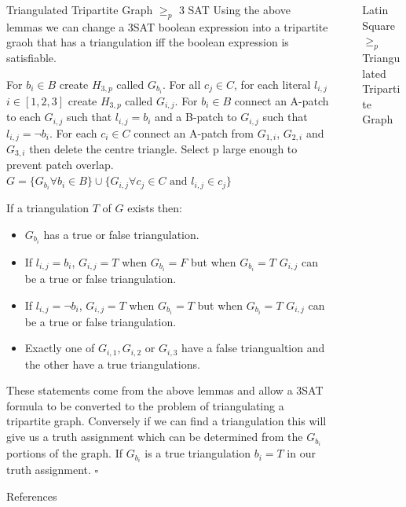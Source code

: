 \documentclass[final]{beamer}
\newlength{\sepwidth}
\newlength{\colwidth}
\newcounter{col}
\newcommand{\separatorcolumn}{\begin{column}{\sepwidth}\end{column}}
\begin{document}
\begin{frame}[t]
\begin{columns}[t]
\begin{column}{\colwidth}
\begin{block}{Triangulated Tripartite Graph $\geq_p$ 3 SAT}
Using the above lemmas we can change a 3SAT boolean expression into a tripartite graoh that has a triangulation iff the boolean expression is satisfiable.

For $b_i\in B$ create $H_{3,p}$ called $G_{b_i}$. For all $c_j\in C$, for each literal $l_{i,j}$ $i\in [1,2,3]$  create $H_{3,p}$ called $G_{i,j}$. For $b_i \in B$ connect an A-patch to each $G_{i,j}$ such that $l_{i,j}=b_i$ and a B-patch to $G_{i,j}$ such that $l_{i,j}=\neg b_i$. For each $c_i\in C$ connect an A-patch from $G_{1,i}$, $G_{2,i}$ and $G_{3,i}$ then delete the centre triangle. Select p large enough to prevent patch overlap. $G = \{G_{b_i} \forall b_i \in B\}\cup\{G_{i,j} \forall c_j\in C\text{ and }l_{i,j}\in c_j \}$

If a triangulation $T$ of $G$ exists then: 
\begin{itemize}
\item $G_{b_i}$ has a true or false triangulation. 
\item If $l_{i,j}=b_i$, $G_{i,j}= T$ when $G_{b_i}=F$ but when $G_{b_i}=T$ $G_{i,j}$ can be a true or false triangulation. 
\item If $l_{i,j}=\neg b_i$, $G_{i,j}= T$ when $G_{b_i}=T$ but when $G_{b_i}=T$ $G_{i,j}$ can be a true or false triangulation. 
\item Exactly one of $G_{i,1}, G_{i,2}$ or $G_{i,3}$ have a false triangualtion and the other have a true triangulations.
\end{itemize}

These statements come from the above lemmas and allow a 3SAT formula to be converted to the problem of triangulating a tripartite graph. Conversely if we can find a triangulation this will give us a truth assignment which can be determined from the $G_{b_i}$ portions of the graph. If $G_{b_i}$ is a true triangulation $b_i = T$ in our truth assignment. $\square$
  \end{block}


  \begin{block}{References}
    \nocite{*}
    \footnotesize{}
  \end{block}
\end{column}

\separatorcolumn
\begin{column}{\colwidth}
 
  \begin{block}{Latin Square $\geq_p$ Triangulated Tripartite Graph}


\end{block}
\end{column}
\end{columns}
\end{frame}
\end{document}
